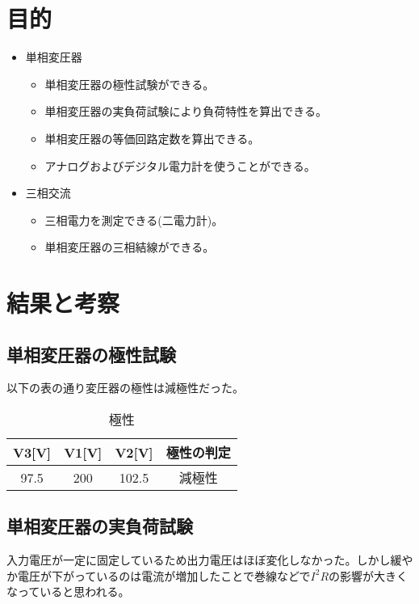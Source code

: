 \documentclass[a4paper,11pt,xelatex,ja=standard]{bxjsarticle}
\begin{document}
\section{目的}
    \begin{itemize}
        \item 単相変圧器
            \begin{itemize}
                \item 単相変圧器の極性試験ができる。
                \item 単相変圧器の実負荷試験により負荷特性を算出できる。
                \item 単相変圧器の等価回路定数を算出できる。
                \item アナログおよびデジタル電力計を使うことができる。
            \end{itemize}
        \item 三相交流
            \begin{itemize}
                \item 三相電力を測定できる(二電力計)。
                \item 単相変圧器の三相結線ができる。
            \end{itemize}
    \end{itemize}
\section{結果と考察}
    \subsection{単相変圧器の極性試験}
    以下の表の通り変圧器の極性は減極性だった。
        \begin{table}[H]
            \begin{tabular}{|c|c|c|c|}
                \hline
                V3[V] & V1[V] & V2[V] & 極性の判定 \\
                \hline
                97.5 & 200 & 102.5 & 減極性 \\
                \hline
            \end{tabular}
            \caption{極性}
        \end{table}
    \subsection{単相変圧器の実負荷試験}
        入力電圧が一定に固定しているため出力電圧はほぼ変化しなかった。しかし緩やか電圧が下がっているのは電流が増加したことで巻線などで$I^2R$の影響が大きくなっていると思われる。
\end{document}
